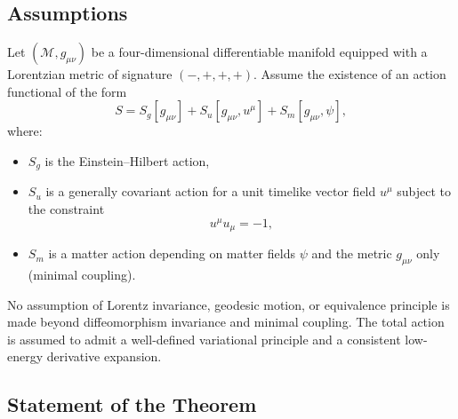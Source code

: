 \documentclass[11pt]{article}
\begin{document}
        \subsection{Assumptions}

            Let $(\mathcal{M}, g_{\mu\nu})$ be a four-dimensional differentiable manifold
            equipped with a Lorentzian metric of signature $(-,+,+,+)$.
            Assume the existence of an action functional of the form
            \begin{equation}
                S = S_g[g_{\mu\nu}] + S_u[g_{\mu\nu}, u^\mu] + S_m[g_{\mu\nu}, \psi],
            \end{equation}
            where:
            \begin{itemize}
                \item $S_g$ is the Einstein--Hilbert action,
                \item $S_u$ is a generally covariant action for a unit timelike vector field
                $u^\mu$ subject to the constraint
                \begin{equation}
                    u^\mu u_\mu = -1,
                \end{equation}
                \item $S_m$ is a matter action depending on matter fields $\psi$ and the
                metric $g_{\mu\nu}$ only (minimal coupling).
            \end{itemize}

            No assumption of Lorentz invariance, geodesic motion, or equivalence principle
            is made beyond diffeomorphism invariance and minimal coupling.
            The total action is assumed to admit a well-defined variational principle and
            a consistent low-energy derivative expansion.

        \subsection{Statement of the Theorem}
\end{document}
